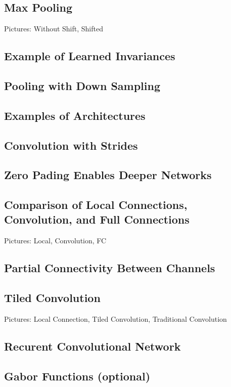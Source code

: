 \documentclass[]{article}
\begin{document}
\subsection{Max Pooling}
Pictures: Without Shift, Shifted

\subsection{Example of Learned Invariances}

\subsection{Pooling with Down Sampling}

\subsection{Examples of Architectures}

\subsection{Convolution with Strides}

\subsection{Zero Pading Enables Deeper Networks}

\subsection{Comparison of Local Connections, Convolution, and Full Connections}
Pictures: Local, Convolution, FC

\subsection{Partial Connectivity Between Channels}

\subsection{Tiled Convolution}
Pictures: Local Connection, Tiled Convolution, Traditional Convolution

\subsection{Recurent Convolutional Network}

\subsection{Gabor Functions (optional)}
\end{document}
